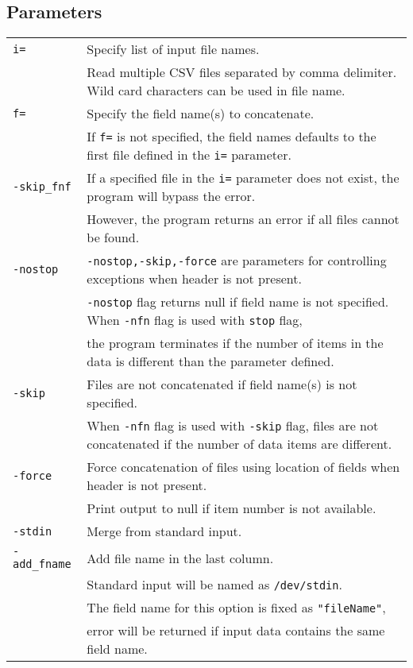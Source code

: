 \subsection*{Parameters}
\begin{table}[htbp]
{\small
\begin{tabular}{ll}
\verb|i=|        & Specify list of input file names. \\
                 & Read multiple CSV files separated by comma delimiter. Wild card characters can be used in file name. \\
\verb|f=|        & Specify the field name(s) to concatenate. \\
                 & If \verb|f=| is not specified, the field names defaults to the first file defined in the \verb|i=| parameter. \\
\verb|-skip_fnf| & If a specified file in  the \verb|i=| parameter does not exist, the program will bypass the error. \\
		& However, the program returns an error if all files cannot be found. \\
\verb|-nostop|   & \verb|-nostop,-skip,-force| are parameters for controlling exceptions when header is not present. \\
                 & \verb|-nostop| flag returns null if field name is not specified. When \verb|-nfn| flag is used with \verb|stop| flag, \\
                 & the program terminates if the number of items in the data is different than the parameter defined. \\
\verb|-skip|     & Files are not concatenated if field name(s) is not specified. \\
                 & When \verb|-nfn| flag is used with \verb|-skip| flag, files are not concatenated if the number of data items are different. \\
\verb|-force|    & Force concatenation of files using location of fields when header is not present. \\
		& Print output to null if item number is not available. \\
\verb|-stdin|    & Merge from standard input. \\
\verb|-add_fname|& Add  file name in the last column. \\
                 & Standard input will be named as \verb|/dev/stdin|.\\
                 & The field name for this option is fixed as \verb|"fileName"|, \\
                 & error will be returned if input data contains the same field name. \\
\end{tabular}
}
\end{table}

